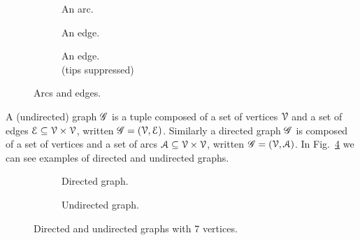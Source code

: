 \documentclass[../main.tex]{subfiles}
\begin{document}
\begin{figure}[h]
\begin{subfigure}[t]{.3\textwidth}
  \centering
  \caption{An arc.}
\end{subfigure}
\hfill
\begin{subfigure}[t]{.3\textwidth}
  \centering
  \caption{An edge.}
\end{subfigure}
\hfill
\begin{subfigure}[t]{.3\textwidth}
  \centering
  \caption{An edge. \\(tips suppressed)}
\end{subfigure}
\caption{Arcs and edges.}\label{fig:arc_edges}
\end{figure}

A (undirected) graph $\mathscr{G}$ is a tuple composed of a set of vertices $\mathcal{V}$ and a set of edges ${\mathcal{E}\subseteq\mathcal{V}\times\mathcal{V}}$, written ${\mathscr{G}=(\mathcal{V},\mathcal{E})}$.
Similarly a directed graph $\mathscr{G}$ is composed of a set of vertices and a set of arcs ${\mathcal{A}\subseteq\mathcal{V}\times\mathcal{V}}$, written ${\mathscr{G}=(\mathcal{V},\mathcal{A})}$.
In Fig.~\ref{fig:directed_undirected_graphs} we can see examples of directed and undirected graphs.

\begin{figure}[h]
  \centering
  \begin{subfigure}[t]{.45\textwidth}
    \centering
    \caption{Directed graph.}\label{fig:graph}
  \end{subfigure}
  \hfill
  \begin{subfigure}[t]{.45\textwidth}
    \centering
    \caption{Undirected graph.}\label{fig:undirected_graph}
  \end{subfigure}
    \caption{Directed and undirected graphs with 7 vertices.}\label{fig:directed_undirected_graphs}
\end{figure}
\end{document}
